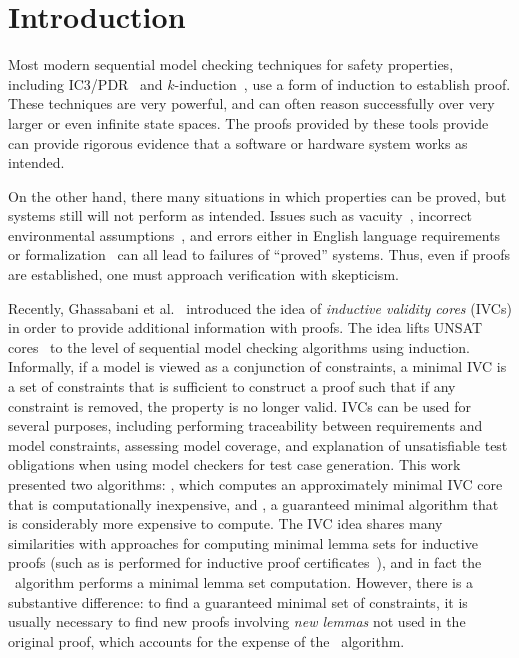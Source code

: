 \section{Introduction}
\label{sec:intro}
Most modern sequential model checking techniques for safety properties, including IC3/PDR~\cite{Een2011:PDR} and $k$-induction~\cite{SheeranSS00}, use a form of induction to establish proof.  These techniques are very powerful, and can often reason successfully over very larger or even infinite state spaces.  The proofs provided by these tools provide can provide rigorous evidence that a software or hardware system works as intended.

On the other hand, there many situations in which properties can be proved, but systems still will not perform as intended.  Issues such as vacuity~\cite{Kupferman03:Vacuity}, incorrect environmental assumptions~\cite{Whalen07:FMICS}, and errors either in English language requirements or formalization~\cite{Pike06:axioms} can all lead to failures of ``proved'' systems.  Thus, even if proofs are established, one must approach verification with skepticism.

Recently, Ghassabani et al.~\cite{Ghass16} introduced the idea of {\em inductive validity cores} (IVCs) in order to provide additional information with proofs.  The idea lifts UNSAT cores~\cite{zhang2003extracting} to the level of sequential model checking algorithms using induction.  Informally, if a model is viewed as a conjunction of constraints, a minimal IVC is a set of constraints that is sufficient to construct a proof such that if any constraint is removed, the property is no longer valid. IVCs can be used for several purposes, including performing traceability between requirements and model constraints, assessing model coverage, and explanation of unsatisfiable test obligations when using model checkers for test case generation.%
This work presented two algorithms: \ucalg, which computes an approximately minimal IVC core that is computationally inexpensive, and \ucbfalg, a guaranteed minimal algorithm that is considerably more expensive to compute. %
%
The IVC idea shares many similarities with approaches for computing minimal lemma sets for inductive proofs (such as is performed for inductive proof certificates~\cite{piskac2016, ivrii2014small}), and in fact the \ucalg\ algorithm performs a minimal lemma set computation.  However, there is a substantive difference: to find a guaranteed minimal set of constraints, it is usually necessary to find new proofs involving {\em new lemmas} not used in the original proof, which accounts for the expense of the \ucbfalg\ algorithm.

